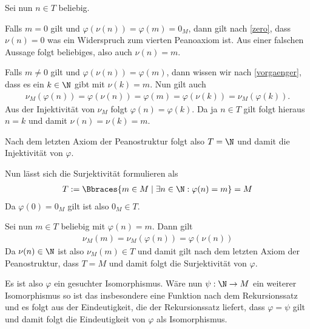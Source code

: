 \begin{solution}
    Sei nun $n \in T$ beliebig.

    Falls $m = 0$ gilt und $\varphi(\nu(n)) = \varphi(m) = 0_M$, dann gilt nach \eqref{zero}, dass $\nu(n) = 0$ was ein Widerspruch zum vierten Peanoaxiom ist. Aus einer falschen Aussage folgt beliebiges, also auch $\nu(n) = m$.

    Falls $m \neq 0$ gilt und $\varphi(\nu(n)) = \varphi(m)$, dann wissen wir nach \eqref{vorgaenger}, dass es ein $k \in \N$ gibt mit $\nu(k) = m$. Nun gilt auch
    \begin{align*}
        \nu_M(\varphi(n)) = \varphi(\nu(n)) = \varphi(m) = \varphi(\nu(k)) = \nu_M(\varphi(k)).
    \end{align*}
    Aus der Injektivität von $\nu_M$ folgt $\varphi(n) = \varphi(k)$. Da ja $n \in T$ gilt folgt hieraus $n = k$ und damit $\nu(n) = \nu(k) = m$.

    Nach dem letzten Axiom der Peanostruktur folgt also $T = \N$ und damit die Injektivität von $\varphi$.

    Nun lässt sich die Surjektivität formulieren als
    \begin{align*}
        T := \Bbraces{m \in M \mid \exists n \in \N: \varphi(n) = m} = M
    \end{align*}
    Da $\varphi(0) = 0_M$ gilt ist also $0_M \in T$.

    Sei nun $m \in T$ beliebig mit $\varphi(n) = m$. Dann gilt
    \begin{align*}
        \nu_M(m) = \nu_M(\varphi(n)) = \varphi(\nu(n))
    \end{align*}
    Da $\nu(n) \in \N$ ist also $\nu_M(m) \in T$ und damit gilt nach dem letzten Axiom der Peanostruktur, dass $T = M$ und damit folgt die Surjektivität von $\varphi$.

    Es ist also $\varphi$ ein gesuchter Isomorphismus. Wäre nun $\psi: \N \to M$ ein weiterer Isomorphismus so ist das insbesondere eine Funktion nach dem Rekursionssatz und es folgt aus der Eindeutigkeit, die der Rekursionssatz liefert, dass $\varphi = \psi$ gilt und damit folgt die Eindeutigkeit von $\varphi$ als Isomorphismus.
\end{solution}
